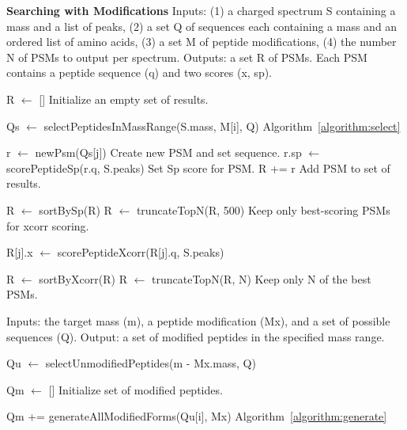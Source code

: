 \documentclass[12pt]{article}
\begin{document}
\begin{algorithm}
\caption{{\bf Searching with Modifications} Inputs: (1) a charged
  spectrum S containing a mass and a list of peaks, (2) a set Q of
  sequences each containing a mass and an ordered list of amino acids,
  (3) a set M of peptide modifications, (4) the number N of PSMs to
  output per spectrum. Outputs: a set R of PSMs.  Each PSM contains a
  peptide sequence (q) and two scores (x, sp).
  \label{algorithm:search}}

\begin{algorithmic}[1]

\State R $\gets$ []
\Comment Initialize an empty set of results.

   \State Qs $\gets$ selectPeptidesInMassRange(S.mass, M[i], Q)
   \Comment Algorithm~\ref{algorithm:select}
   
     \State r $\gets$ newPsm(Qs[j])
     \Comment Create new PSM and set sequence.
     \State r.sp $\gets$ scorePeptideSp(r.q, S.peaks)
     \Comment Set Sp score for PSM.
     \State R += r
     \Comment Add PSM to set of results.
   \EndFor

   \State R $\gets$ sortBySp(R)
   \State R $\gets$ truncateTopN(R, 500)
   \Comment Keep only best-scoring PSMs for xcorr scoring.

     \State R[j].x $\gets$ scorePeptideXcorr(R[j].q, S.peaks)
   \EndFor

   \State R $\gets$ sortByXcorr(R)
   \State R $\gets$ truncateTopN(R, N)
   \Comment Keep only N of the best PSMs.

\EndFor

\State {}
\EndProcedure
\end{algorithmic}
\end{algorithm}

\begin{algorithm}
\caption{ Inputs: the target mass (m), a peptide modification (Mx),
  and a set of possible sequences (Q).  Output: a set of modified
  peptides in the specified mass range.
  \label{algorithm:select}}

\begin{algorithmic}[1]
  \State Qu $\gets$ selectUnmodifiedPeptides(m - Mx.mass, Q)
   
  \State Qm $\gets$ []
  \Comment Initialize set of modified peptides.

      \State Qm += generateAllModifiedForms(Qu[i], Mx)
      \Comment Algorithm~\ref{algorithm:generate}
    \EndIf
  \EndFor

  \State {}
\EndProcedure
\end{algorithmic}
\end{algorithm}
\end{document}
